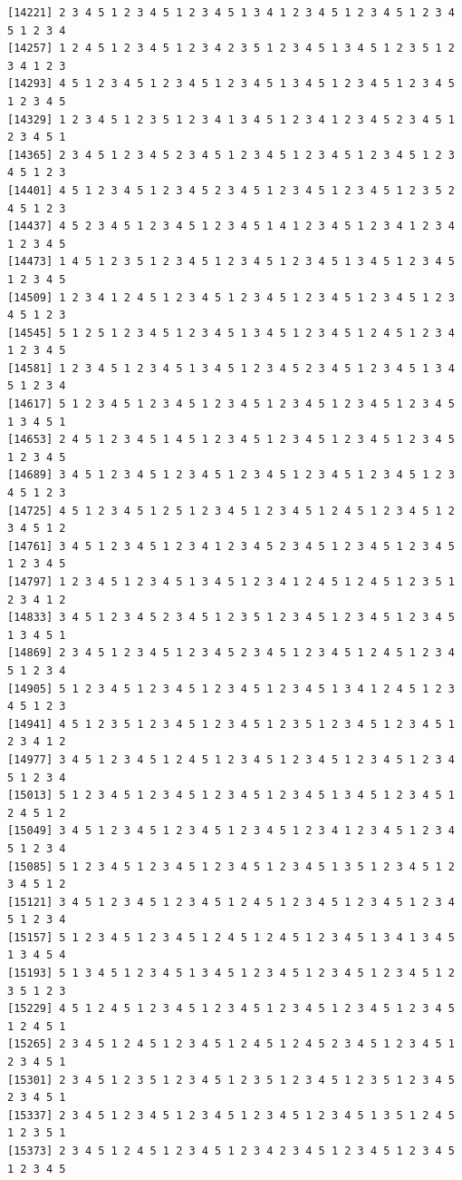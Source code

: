 \documentclass[
  11pt,
]{book}
\begin{document}
\begin{verbatim}
[14221] 2 3 4 5 1 2 3 4 5 1 2 3 4 5 1 3 4 1 2 3 4 5 1 2 3 4 5 1 2 3 4 5 1 2 3 4
[14257] 1 2 4 5 1 2 3 4 5 1 2 3 4 2 3 5 1 2 3 4 5 1 3 4 5 1 2 3 5 1 2 3 4 1 2 3
[14293] 4 5 1 2 3 4 5 1 2 3 4 5 1 2 3 4 5 1 3 4 5 1 2 3 4 5 1 2 3 4 5 1 2 3 4 5
[14329] 1 2 3 4 5 1 2 3 5 1 2 3 4 1 3 4 5 1 2 3 4 1 2 3 4 5 2 3 4 5 1 2 3 4 5 1
[14365] 2 3 4 5 1 2 3 4 5 2 3 4 5 1 2 3 4 5 1 2 3 4 5 1 2 3 4 5 1 2 3 4 5 1 2 3
[14401] 4 5 1 2 3 4 5 1 2 3 4 5 2 3 4 5 1 2 3 4 5 1 2 3 4 5 1 2 3 5 2 4 5 1 2 3
[14437] 4 5 2 3 4 5 1 2 3 4 5 1 2 3 4 5 1 4 1 2 3 4 5 1 2 3 4 1 2 3 4 1 2 3 4 5
[14473] 1 4 5 1 2 3 5 1 2 3 4 5 1 2 3 4 5 1 2 3 4 5 1 3 4 5 1 2 3 4 5 1 2 3 4 5
[14509] 1 2 3 4 1 2 4 5 1 2 3 4 5 1 2 3 4 5 1 2 3 4 5 1 2 3 4 5 1 2 3 4 5 1 2 3
[14545] 5 1 2 5 1 2 3 4 5 1 2 3 4 5 1 3 4 5 1 2 3 4 5 1 2 4 5 1 2 3 4 1 2 3 4 5
[14581] 1 2 3 4 5 1 2 3 4 5 1 3 4 5 1 2 3 4 5 2 3 4 5 1 2 3 4 5 1 3 4 5 1 2 3 4
[14617] 5 1 2 3 4 5 1 2 3 4 5 1 2 3 4 5 1 2 3 4 5 1 2 3 4 5 1 2 3 4 5 1 3 4 5 1
[14653] 2 4 5 1 2 3 4 5 1 4 5 1 2 3 4 5 1 2 3 4 5 1 2 3 4 5 1 2 3 4 5 1 2 3 4 5
[14689] 3 4 5 1 2 3 4 5 1 2 3 4 5 1 2 3 4 5 1 2 3 4 5 1 2 3 4 5 1 2 3 4 5 1 2 3
[14725] 4 5 1 2 3 4 5 1 2 5 1 2 3 4 5 1 2 3 4 5 1 2 4 5 1 2 3 4 5 1 2 3 4 5 1 2
[14761] 3 4 5 1 2 3 4 5 1 2 3 4 1 2 3 4 5 2 3 4 5 1 2 3 4 5 1 2 3 4 5 1 2 3 4 5
[14797] 1 2 3 4 5 1 2 3 4 5 1 3 4 5 1 2 3 4 1 2 4 5 1 2 4 5 1 2 3 5 1 2 3 4 1 2
[14833] 3 4 5 1 2 3 4 5 2 3 4 5 1 2 3 5 1 2 3 4 5 1 2 3 4 5 1 2 3 4 5 1 3 4 5 1
[14869] 2 3 4 5 1 2 3 4 5 1 2 3 4 5 2 3 4 5 1 2 3 4 5 1 2 4 5 1 2 3 4 5 1 2 3 4
[14905] 5 1 2 3 4 5 1 2 3 4 5 1 2 3 4 5 1 2 3 4 5 1 3 4 1 2 4 5 1 2 3 4 5 1 2 3
[14941] 4 5 1 2 3 5 1 2 3 4 5 1 2 3 4 5 1 2 3 5 1 2 3 4 5 1 2 3 4 5 1 2 3 4 1 2
[14977] 3 4 5 1 2 3 4 5 1 2 4 5 1 2 3 4 5 1 2 3 4 5 1 2 3 4 5 1 2 3 4 5 1 2 3 4
[15013] 5 1 2 3 4 5 1 2 3 4 5 1 2 3 4 5 1 2 3 4 5 1 3 4 5 1 2 3 4 5 1 2 4 5 1 2
[15049] 3 4 5 1 2 3 4 5 1 2 3 4 5 1 2 3 4 5 1 2 3 4 1 2 3 4 5 1 2 3 4 5 1 2 3 4
[15085] 5 1 2 3 4 5 1 2 3 4 5 1 2 3 4 5 1 2 3 4 5 1 3 5 1 2 3 4 5 1 2 3 4 5 1 2
[15121] 3 4 5 1 2 3 4 5 1 2 3 4 5 1 2 4 5 1 2 3 4 5 1 2 3 4 5 1 2 3 4 5 1 2 3 4
[15157] 5 1 2 3 4 5 1 2 3 4 5 1 2 4 5 1 2 4 5 1 2 3 4 5 1 3 4 1 3 4 5 1 3 4 5 4
[15193] 5 1 3 4 5 1 2 3 4 5 1 3 4 5 1 2 3 4 5 1 2 3 4 5 1 2 3 4 5 1 2 3 5 1 2 3
[15229] 4 5 1 2 4 5 1 2 3 4 5 1 2 3 4 5 1 2 3 4 5 1 2 3 4 5 1 2 3 4 5 1 2 4 5 1
[15265] 2 3 4 5 1 2 4 5 1 2 3 4 5 1 2 4 5 1 2 4 5 2 3 4 5 1 2 3 4 5 1 2 3 4 5 1
[15301] 2 3 4 5 1 2 3 5 1 2 3 4 5 1 2 3 5 1 2 3 4 5 1 2 3 5 1 2 3 4 5 2 3 4 5 1
[15337] 2 3 4 5 1 2 3 4 5 1 2 3 4 5 1 2 3 4 5 1 2 3 4 5 1 3 5 1 2 4 5 1 2 3 5 1
[15373] 2 3 4 5 1 2 4 5 1 2 3 4 5 1 2 3 4 2 3 4 5 1 2 3 4 5 1 2 3 4 5 1 2 3 4 5

\end{verbatim}
\end{document}
